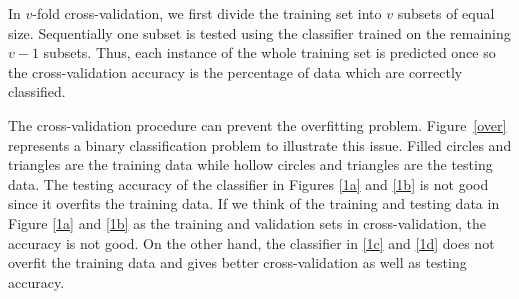\documentclass[12pt]{article}
\begin{document}
In $v$-fold cross-validation, we first divide the training set into
$v$ subsets of equal size. Sequentially one subset is tested using the
classifier trained on the remaining $v-1$ subsets.  Thus, each
instance of the whole training set is predicted once so the
cross-validation accuracy is the percentage of data which are
correctly classified.

The cross-validation procedure can prevent the overfitting
problem. Figure~\ref{over} represents a binary classification problem
to illustrate this issue. Filled circles and triangles are the
training data while hollow circles and triangles are the testing
data. The testing accuracy of the classifier in Figures \ref{1a} and
\ref{1b} is not good since it overfits the training data. If we think
of the training and testing data in Figure \ref{1a} and \ref{1b} as
the training and validation sets in cross-validation, the accuracy is
not good. On the other hand, the classifier in \ref{1c} and \ref{1d}
does not overfit the training data and gives better cross-validation
as well as testing accuracy.
\end{document}
